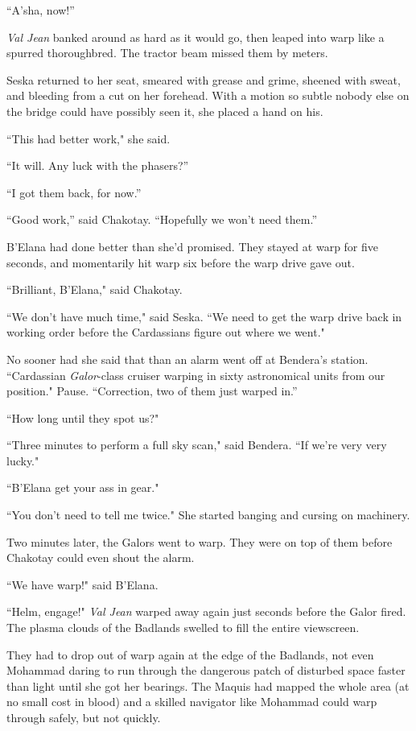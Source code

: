 \documentclass[twoside,letterpaper,12pt]{memoir}
\begin{document}
``A'sha, now!''

\textit{Val Jean} banked around as hard as it would go, then leaped into warp like a spurred thoroughbred. The tractor beam missed them by meters.

Seska returned to her seat, smeared with grease and grime, sheened with sweat, and bleeding from a cut on her forehead. With a motion so subtle nobody else on the bridge could have possibly seen it, she placed a hand on his.

``This had better work," she said.

``It will. Any luck with the phasers?''

``I got them back, for now.''

``Good work,'' said Chakotay. ``Hopefully we won't need them.''

B'Elana had done better than she'd promised. They stayed at warp for five seconds, and momentarily hit warp six before the warp drive gave out.

``Brilliant, B'Elana," said Chakotay.

``We don't have much time," said Seska. ``We need to get the warp drive back in working order before the Cardassians figure out where we went."

No sooner had she said that than an alarm went off at Bendera's station. ``Cardassian \textit{Galor}-class cruiser warping in sixty astronomical units from our position." Pause. ``Correction, two of them just warped in.''

``How long until they spot us?"

``Three minutes to perform a full sky scan," said Bendera. ``If we're very very lucky."

``B'Elana get your ass in gear."

``You don't need to tell me twice." She started banging and cursing on machinery.

Two minutes later, the Galors went to warp. They were on top of them before Chakotay could even shout the alarm.

``We have warp!" said B'Elana.

``Helm, engage!" \textit{Val Jean} warped away again just seconds before the Galor fired. The plasma clouds of the Badlands swelled to fill the entire viewscreen.

They had to drop out of warp again at the edge of the Badlands, not even Mohammad daring to run through the dangerous patch of disturbed space faster than light until she got her bearings. The Maquis had mapped the whole area (at no small cost in blood) and a skilled navigator like Mohammad could warp through safely, but not quickly.
\end{document}
